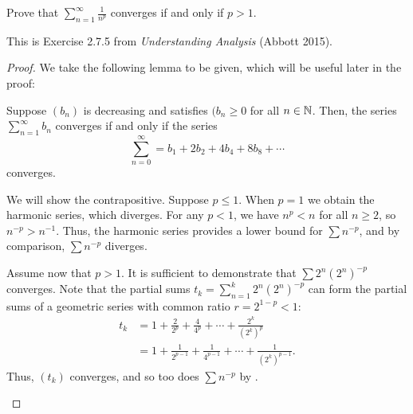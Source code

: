 \begin{problem}
  Prove that $\displaystyle \sum_{n=1}^{\infty} \frac{1}{n^{p}}$ converges if and only if $p > 1$.

  \leavevmode\par\noindent

  \begin{callout}
    This is Exercise 2.7.5 from \textit{Understanding Analysis} (Abbott 2015).
  \end{callout}

  \begin{proof}

    We take the following lemma to be given, which will be useful later in the proof:
    \begin{lemma}
      \label{lem:2.4.6}
      Suppose $(b_{n})$ is decreasing and satisfies $(b_{n} \geq 0$ for all $n \in \mathbb{N}$. Then, the series
      $\sum_{n=1}^{\infty} b_{n}$ converges if and only if the series
      \[
        \sum_{n=0}^{\infty} = b_{1} + 2b_{2} + 4b_{4} + 8b_{8} + \cdots
      \]
      converges.
    \end{lemma}

    \begin{forwardimplication}
      We will show the contrapositive. Suppose $p \le 1$.
      When $p = 1$ we obtain the harmonic series, which diverges.
      For any $p < 1$, we have $n^{p} < n$ for all $n \ge 2$, so $n^{-p} > n^{-1}$.
      Thus, the harmonic series provides a lower bound for $\sum n^{-p}$, and by
      comparison, $\sum n^{-p}$ diverges.
    \end{forwardimplication}

    \vspace{\baselineskip}
  
    \begin{backwardimplication}
      Assume now that $p > 1$. It is sufficient to  demonstrate that $\sum 2^{n}(2^{n})^{-p}$
      converges. Note that the partial sums $t_{k} = \sum_{n=1}^{k} 2^{n}(2^{n})^{-p}$
      can form the partial sums of a geometric series with common ratio $r = 2^{1-p} < 1$:
      \begin{align*}
        t_{k} &= 1 + \frac{2}{2^{p}} + \frac{4}{4^{p}} + \cdots + \frac{2^{k}}{(2^{k})^{p}}\\
              &= 1 + \frac{1}{2^{p-1}} + \frac{1}{4^{p-1}} + \cdots + \frac{1}{(2^{k})^{p-1}}.
      \end{align*}
      Thus, $(t_{k})$ converges, and so too does $\sum n^{-p}$ by .
    \end{backwardimplication}
  \end{proof}
\end{problem}

